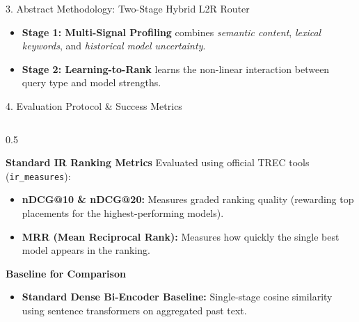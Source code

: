 \documentclass[aspectratio=169, 10pt]{beamer}
\begin{document}
\begin{frame}{3. Abstract Methodology: Two-Stage Hybrid L2R Router}
    \vspace{0.1cm}
    \begin{itemize}
        \item \textbf{Stage 1: Multi-Signal Profiling} combines \textit{semantic content}, \textit{lexical keywords}, and \textit{historical model uncertainty}.
        \item \textbf{Stage 2: Learning-to-Rank} learns the non-linear interaction between query type and model strengths.
    \end{itemize}
\end{frame}

\begin{frame}{4. Evaluation Protocol \& Success Metrics}
    \begin{columns}[T]
        \begin{column}{0.5\textwidth}
            \begin{block}{\textbf{Standard IR Ranking Metrics}}
                Evaluated using official TREC tools (\texttt{ir\_measures}):
                \begin{itemize}
                    \item \textbf{nDCG@10 \& nDCG@20:} Measures graded ranking quality (rewarding top placements for the highest-performing models).
                    \item \textbf{MRR (Mean Reciprocal Rank):} Measures how quickly the single best model appears in the ranking.
                \end{itemize}
            \end{block}
            
            \vspace{0.2cm}
            \begin{block}{\textbf{Baseline for Comparison}}
                \begin{itemize}
                    \item \textbf{Standard Dense Bi-Encoder Baseline:} Single-stage cosine similarity using sentence transformers on aggregated past text.
                \end{itemize}
            \end{block}
        \end{column}


\end{columns}
\end{frame}
\end{document}
